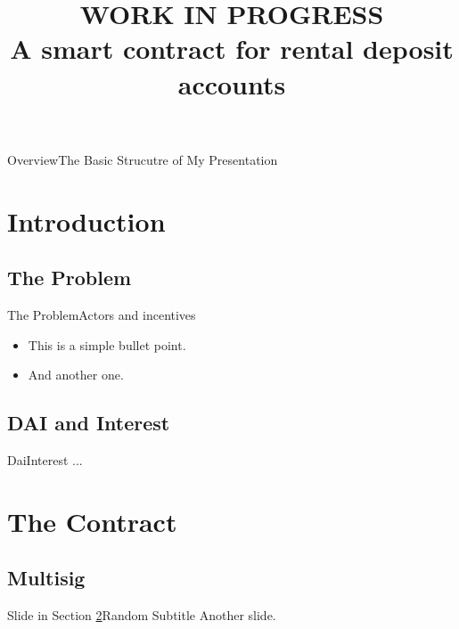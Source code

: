 \documentclass{beamer}
\title{WORK IN PROGRESS \\ A smart contract for rental deposit accounts}
\begin{document}
  \begin{frame}[plain]
    \titlepage
  \end{frame}
  
\begin{frame}{Overview}{The Basic Strucutre of My Presentation}
  \tableofcontents
\end{frame}

\section{Introduction}

\subsection{The Problem}

\begin{frame}{The Problem}{Actors and incentives}
  \begin{itemize}
    \item<1->{This is a simple bullet point.}
    \item<2->{And another one.}
  \end{itemize}
  \vspace{1em}
\end{frame}


\subsection{DAI and Interest}

\begin{frame}{Dai}{Interest}
  ...
\end{frame}


\section{The Contract}
  \label{sec:contract}

\subsection{Multisig}

\begin{frame}{Slide in Section \ref{sec:contract}}{Random Subtitle}
  Another slide.
\end{frame}
\end{document}
